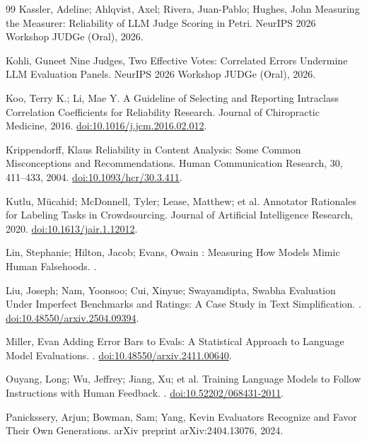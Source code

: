 \begin{thebibliography}{99}
Kassler, Adeline; Ahlqvist, Axel; Rivera, Juan-Pablo; Hughes, John
\newblock Measuring the Measurer: Reliability of {LLM} Judge Scoring in {Petri}.
\newblock NeurIPS 2026 Workshop JUDGe (Oral), 2026.

Kohli, Guneet
\newblock Nine Judges, Two Effective Votes: Correlated Errors Undermine {LLM} Evaluation Panels.
\newblock NeurIPS 2026 Workshop JUDGe (Oral), 2026.

Koo, Terry K.; Li, Mae Y.
\newblock A Guideline of Selecting and Reporting Intraclass Correlation Coefficients for Reliability Research.
\newblock Journal of Chiropractic Medicine, 2016. \href{https://doi.org/10.1016/j.jcm.2016.02.012}{doi:10.1016/j.jcm.2016.02.012}.

Krippendorff, Klaus
\newblock Reliability in Content Analysis: Some Common Misconceptions and Recommendations.
\newblock Human Communication Research, 30, 411--433, 2004. \href{https://doi.org/10.1093/hcr/30.3.411}{doi:10.1093/hcr/30.3.411}.

Kutlu, M\"ucahid; McDonnell, Tyler; Lease, Matthew; et al.
\newblock Annotator Rationales for Labeling Tasks in Crowdsourcing.
\newblock Journal of Artificial Intelligence Research, 2020. \href{https://doi.org/10.1613/jair.1.12012}{doi:10.1613/jair.1.12012}.

Lin, Stephanie; Hilton, Jacob; Evans, Owain
: Measuring How Models Mimic Human Falsehoods.
.

Liu, Joseph; Nam, Yoonsoo; Cui, Xinyue; Swayamdipta, Swabha
\newblock Evaluation Under Imperfect Benchmarks and Ratings: A Case Study in Text Simplification.
. \href{https://doi.org/10.48550/arxiv.2504.09394}{doi:10.48550/arxiv.2504.09394}.

Miller, Evan
\newblock Adding Error Bars to Evals: A Statistical Approach to Language Model Evaluations.
. \href{https://doi.org/10.48550/arxiv.2411.00640}{doi:10.48550/arxiv.2411.00640}.

Ouyang, Long; Wu, Jeffrey; Jiang, Xu; et al.
\newblock Training Language Models to Follow Instructions with Human Feedback.
. \href{https://doi.org/10.52202/068431-2011}{doi:10.52202/068431-2011}.

Panickssery, Arjun; Bowman, Sam; Yang, Kevin
 Evaluators Recognize and Favor Their Own Generations.
\newblock arXiv preprint arXiv:2404.13076, 2024.


\end{thebibliography}
